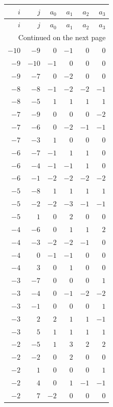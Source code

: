 \begin{longtable}{rrrrrr}
\toprule
$i$ & $j$ & $a_0$ & $a_1$ & $a_2$ & $a_3$ \\
\midrule
\endfirsthead
\toprule
$i$ & $j$ & $a_0$ & $a_1$ & $a_2$ & $a_3$ \\
\midrule
\endhead
\midrule
\multicolumn{6}{r}{Continued on the next page} \\
\endfoot
\bottomrule
\endlastfoot
$-10$ & $-9$ & $0$ & $-1$ & $0$ & $0$ \\
$-9$ & $-10$ & $-1$ & $0$ & $0$ & $0$ \\
$-9$ & $-7$ & $0$ & $-2$ & $0$ & $0$ \\
$-8$ & $-8$ & $-1$ & $-2$ & $-2$ & $-1$ \\
$-8$ & $-5$ & $1$ & $1$ & $1$ & $1$ \\
$-7$ & $-9$ & $0$ & $0$ & $0$ & $-2$ \\
$-7$ & $-6$ & $0$ & $-2$ & $-1$ & $-1$ \\
$-7$ & $-3$ & $1$ & $0$ & $0$ & $0$ \\
$-6$ & $-7$ & $-1$ & $1$ & $1$ & $0$ \\
$-6$ & $-4$ & $-1$ & $-1$ & $1$ & $0$ \\
$-6$ & $-1$ & $-2$ & $-2$ & $-2$ & $-2$ \\
$-5$ & $-8$ & $1$ & $1$ & $1$ & $1$ \\
$-5$ & $-2$ & $-2$ & $-3$ & $-1$ & $-1$ \\
$-5$ & $1$ & $0$ & $2$ & $0$ & $0$ \\
$-4$ & $-6$ & $0$ & $1$ & $1$ & $2$ \\
$-4$ & $-3$ & $-2$ & $-2$ & $-1$ & $0$ \\
$-4$ & $0$ & $-1$ & $-1$ & $0$ & $0$ \\
$-4$ & $3$ & $0$ & $1$ & $0$ & $0$ \\
$-3$ & $-7$ & $0$ & $0$ & $0$ & $1$ \\
$-3$ & $-4$ & $0$ & $-1$ & $-2$ & $-2$ \\
$-3$ & $-1$ & $0$ & $0$ & $0$ & $1$ \\
$-3$ & $2$ & $2$ & $1$ & $1$ & $-1$ \\
$-3$ & $5$ & $1$ & $1$ & $1$ & $1$ \\
$-2$ & $-5$ & $1$ & $3$ & $2$ & $2$ \\
$-2$ & $-2$ & $0$ & $2$ & $0$ & $0$ \\
$-2$ & $1$ & $0$ & $0$ & $0$ & $1$ \\
$-2$ & $4$ & $0$ & $1$ & $-1$ & $-1$ \\
$-2$ & $7$ & $-2$ & $0$ & $0$ & $0$ \\

\end{longtable}

